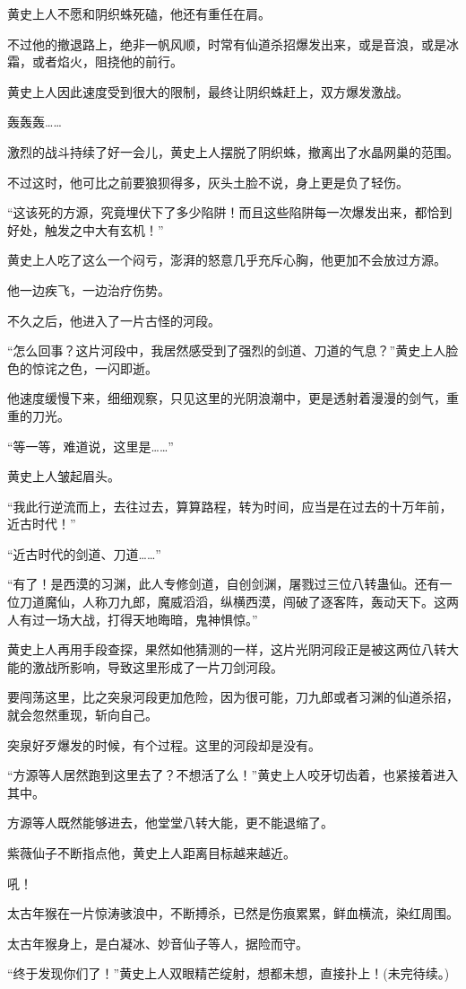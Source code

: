 \begin{this_body}
黄史上人不愿和阴织蛛死磕，他还有重任在肩。

不过他的撤退路上，绝非一帆风顺，时常有仙道杀招爆发出来，或是音浪，或是冰霜，或者焰火，阻挠他的前行。

黄史上人因此速度受到很大的限制，最终让阴织蛛赶上，双方爆发激战。

轰轰轰……

激烈的战斗持续了好一会儿，黄史上人摆脱了阴织蛛，撤离出了水晶网巢的范围。

不过这时，他可比之前要狼狈得多，灰头土脸不说，身上更是负了轻伤。

“这该死的方源，究竟埋伏下了多少陷阱！而且这些陷阱每一次爆发出来，都恰到好处，触发之中大有玄机！”

黄史上人吃了这么一个闷亏，澎湃的怒意几乎充斥心胸，他更加不会放过方源。

他一边疾飞，一边治疗伤势。

不久之后，他进入了一片古怪的河段。

“怎么回事？这片河段中，我居然感受到了强烈的剑道、刀道的气息？”黄史上人脸色的惊诧之色，一闪即逝。

他速度缓慢下来，细细观察，只见这里的光阴浪潮中，更是透射着漫漫的剑气，重重的刀光。

“等一等，难道说，这里是……”

黄史上人皱起眉头。

“我此行逆流而上，去往过去，算算路程，转为时间，应当是在过去的十万年前，近古时代！”

“近古时代的剑道、刀道……”

“有了！是西漠的习渊，此人专修剑道，自创剑渊，屠戮过三位八转蛊仙。还有一位刀道魔仙，人称刀九郎，魔威滔滔，纵横西漠，闯破了逐客阵，轰动天下。这两人有过一场大战，打得天地晦暗，鬼神惧惊。”

黄史上人再用手段查探，果然如他猜测的一样，这片光阴河段正是被这两位八转大能的激战所影响，导致这里形成了一片刀剑河段。

要闯荡这里，比之突泉河段更加危险，因为很可能，刀九郎或者习渊的仙道杀招，就会忽然重现，斩向自己。

突泉好歹爆发的时候，有个过程。这里的河段却是没有。

“方源等人居然跑到这里去了？不想活了么！”黄史上人咬牙切齿着，也紧接着进入其中。

方源等人既然能够进去，他堂堂八转大能，更不能退缩了。

紫薇仙子不断指点他，黄史上人距离目标越来越近。

吼！

太古年猴在一片惊涛骇浪中，不断搏杀，已然是伤痕累累，鲜血横流，染红周围。

太古年猴身上，是白凝冰、妙音仙子等人，据险而守。

“终于发现你们了！”黄史上人双眼精芒绽射，想都未想，直接扑上！(未完待续。)

\end{this_body}

